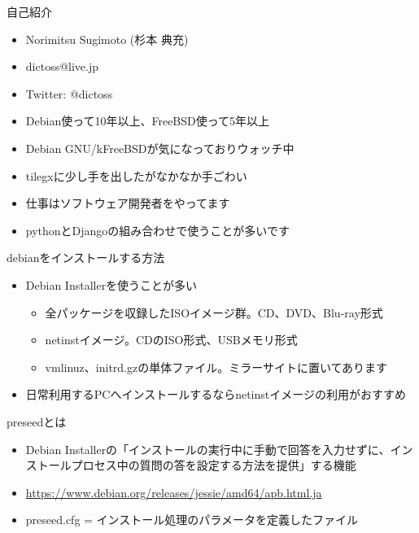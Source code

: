 \begin{frame}{自己紹介}
  \begin{itemize}
  \item Norimitsu Sugimoto (杉本 典充)
  \item dictoss@live.jp
  \item Twitter: @dictoss
  \item Debian使って10年以上、FreeBSD使って5年以上
  \item Debian GNU/kFreeBSDが気になっておりウォッチ中
  \item tilegxに少し手を出したがなかなか手ごわい
  \item 仕事はソフトウェア開発者をやってます
  \item pythonとDjangoの組み合わせで使うことが多いです
  \end{itemize}
\end{frame}



\begin{frame}[containsverbatim]{debianをインストールする方法}
  \begin{itemize}
  \item Debian Installerを使うことが多い
    \begin{itemize}
    \item 全パッケージを収録したISOイメージ群。CD、DVD、Blu-ray形式
    \item netinstイメージ。CDのISO形式、USBメモリ形式
    \item vmlinuz、initrd.gzの単体ファイル。ミラーサイトに置いてあります
    \end{itemize}
  \item 日常利用するPCへインストールするならnetinstイメージの利用がおすすめ
  \end{itemize}
\end{frame}



\begin{frame}[containsverbatim]{preseedとは}
  \begin{itemize}
  \item Debian Installerの「インストールの実行中に手動で回答を入力せずに、インストールプロセス中の質問の答を設定する方法を提供」する機能
  \item \url{https://www.debian.org/releases/jessie/amd64/apb.html.ja}
  \item preseed.cfg = インストール処理のパラメータを定義したファイル
  \end{itemize}
\end{frame}

